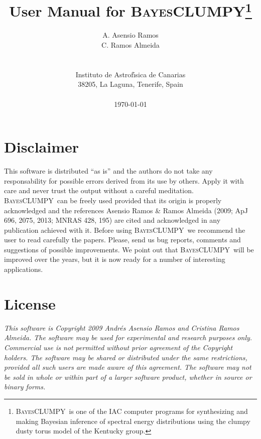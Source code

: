 \documentclass[12pt]{article}
\def\B{\textsc{BayesCLUMPY}}
\begin{document}
\title                  {\sc User Manual for \B\footnote{\B\ is one of the IAC computer
programs for synthesizing and making Bayesian inference of spectral energy distributions using the
clumpy dusty torus model of the Kentucky group.}}

\author{ A. Asensio Ramos \\ C. Ramos Almeida\\\\\\
         Instituto de Astrof\'{\i}sica de Canarias\\
         38205, La Laguna, Tenerife, Spain\\
        \\[0.5in] \today}
\date{}
\maketitle

\newpage

\tableofcontents

\newpage

\section*{Disclaimer}

This software is distributed ``as is'' and the authors do not take any responsability for
possible errors derived from its use by others. Apply it with care and
never trust the output without a careful meditation. \B\ can be freely used
provided that its origin is properly acknowledged and the references Asensio Ramos \& 
Ramos Almeida (2009; ApJ 696, 2075, 2013; MNRAS 428, 195) are cited and acknowledged in any
publication achieved with it. Before using \B\ we recommend the user to read carefully the
papers. Please, 
send us bug reports, comments and suggestions of possible improvements.
We point out that \B\ will be improved over the years, but it is now ready for a number of
interesting applications.

\section*{License}
\emph{This software is Copyright 2009 Andr\'es Asensio Ramos and Cristina Ramos Almeida. The software
may be used for experimental and research purposes only. Commercial use is
not permitted without prior agreement of the Copyright holders. The
software may be shared or distributed under the same restrictions, provided
all such users are made aware of this agreement. The software may not be
sold in whole or within part of a larger software product, whether in
source or binary forms.}
\end{document}
